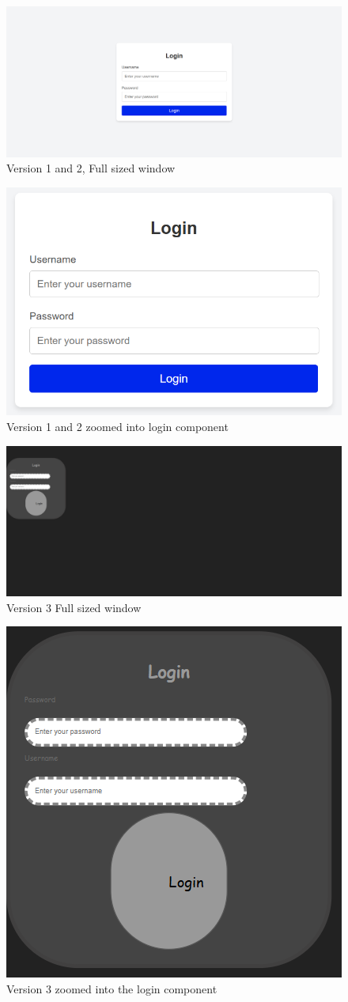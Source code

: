 \documentclass[journal,twocolumn]{IEEEtran}
\begin{document}
\begin{figure}[H]
    \centering
    \includegraphics[width=0.6\linewidth]{login-full-size.png}
    \caption{Version 1 and 2, Full sized window}
    \label{v1-2-full}
\end{figure}

\begin{figure}[H]
    \centering
    \includegraphics[width=0.6\linewidth]{login normal.png}
    \caption{Version 1 and 2 zoomed into login component}
    \label{v1-2-zoom}
\end{figure}

\begin{figure}[H]
    \centering
    \includegraphics[width=0.6\linewidth]{V3 full size.png}
    \caption{Version 3 Full sized window}
    \label{v3-full}
\end{figure}

\begin{figure}[H]
    \centering
    \includegraphics[width=0.6\linewidth]{V3 zoomed in.png}
    \caption{Version 3 zoomed into the login component}
    \label{v3-zoom}
\end{figure}
\end{document}
